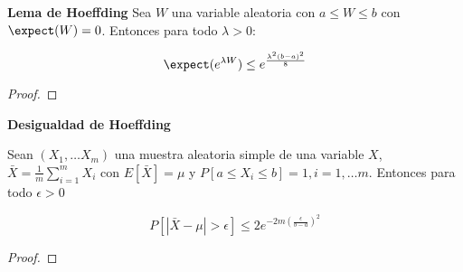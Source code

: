 \begin{lemma} \textbf{Lema de Hoeffding}
 Sea $W$ una variable aleatoria con $a\le W \le b$ con $\expect(W) = 0$. Entonces para todo $\lambda > 0$:
 
 \[\expect(e^{\lambda W}) \le e^{\frac{\lambda^2(b-a)^2}{8}}\]
 
 \label{lemma:hoeffding}
\end{lemma}

\begin{proof}
 
\end{proof}


\begin{lemma} \textbf{Desigualdad de Hoeffding}

 Sean $(X_1, \ldots X_m)$ una muestra aleatoria simple de una variable $X$, 
 $\bar{X} = \frac{1}{m} \sum_{i=1}^m X_i$ con $E[\bar{X}] = \mu$ y $P[a \le X_i \le b] = 1, i=1, \ldots m$. 
 Entonces para todo $\epsilon > 0$

 \[P\left[\left| \bar{X} - \mu \right| > \epsilon \right] \le 2e^{-2m \left(\frac{\epsilon}{b-a}\right)^2}\]
 
 \label{ineq:hoeffding}
\end{lemma}

\begin{proof}
 
\end{proof}
